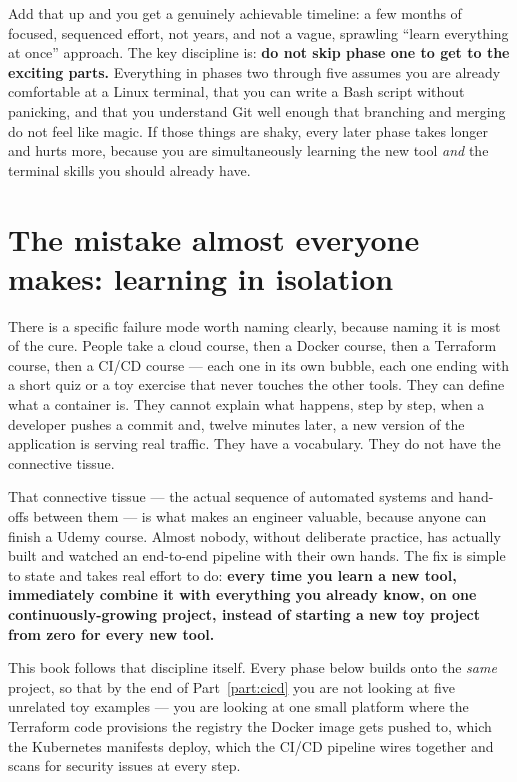 \documentclass[11pt,twoside,openright]{book}
\begin{document}
Add that up and you get a genuinely achievable timeline: a few months of focused,
sequenced effort, not years, and not a vague, sprawling ``learn everything at once''
approach. The key discipline is: \textbf{do not skip phase one to get to the exciting
parts.} Everything in phases two through five assumes you are already comfortable at a
Linux terminal, that you can write a Bash script without panicking, and that you understand
Git well enough that branching and merging do not feel like magic. If those things are
shaky, every later phase takes longer and hurts more, because you are simultaneously
learning the new tool \emph{and} the terminal skills you should already have.

\section{The mistake almost everyone makes: learning in isolation}

There is a specific failure mode worth naming clearly, because naming it is most of the
cure. People take a cloud course, then a Docker course, then a Terraform course, then a
CI/CD course --- each one in its own bubble, each one ending with a short quiz or a toy
exercise that never touches the other tools. They can define what a container is. They
cannot explain what happens, step by step, when a developer pushes a commit and, twelve
minutes later, a new version of the application is serving real traffic. They have a
vocabulary. They do not have the connective tissue.

That connective tissue --- the actual sequence of automated systems and hand-offs between
them --- is what makes an engineer valuable, because anyone can finish a Udemy course.
Almost nobody, without deliberate practice, has actually built and watched an end-to-end
pipeline with their own hands. The fix is simple to state and takes real effort to do:
\textbf{every time you learn a new tool, immediately combine it with everything you
already know, on one continuously-growing project, instead of starting a new toy project
from zero for every new tool.}

This book follows that discipline itself. Every phase below builds onto the \emph{same}
project, so that by the end of Part~\ref{part:cicd} you are not looking at five unrelated
toy examples --- you are looking at one small platform where the Terraform code
provisions the registry the Docker image gets pushed to, which the Kubernetes manifests
deploy, which the CI/CD pipeline wires together and scans for security issues at every
step.
\end{document}
